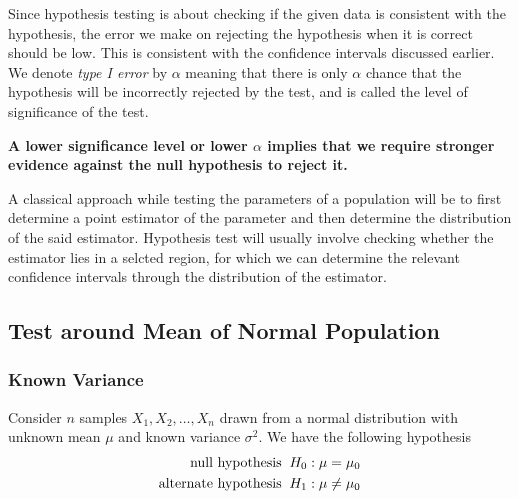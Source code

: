 \documentclass[../probability-notes.tex]{subfiles}
\begin{document}
    Since hypothesis testing is about checking if the given data is consistent with the hypothesis, the error we make on rejecting the hypothesis when it is correct should be low. This is consistent with the confidence intervals discussed earlier. We denote \emph{type I error} by $\alpha$ meaning that there is only $\alpha$ chance that the hypothesis will be incorrectly rejected by the test, and is called the level of significance of the test.\newline

    \textbf{A lower significance level or lower $\alpha$ implies that we require stronger evidence against the null hypothesis to reject it.}

    A classical approach while testing the parameters of a population will be to first determine a point estimator of the parameter and then determine the distribution of the said estimator. Hypothesis test will usually involve checking whether the estimator lies in a selcted region, for which we can determine the relevant confidence intervals through the distribution of the estimator.\newline

    
    \subsection{Test around Mean of Normal Population}
    \subsubsection{Known Variance}\label{sec:mean_normal_known_variance}
    Consider $n$ samples $X_{1}, X_{2}, \ldots, X_{n}$ drawn from a normal distribution with unknown mean $\mu$ and known variance $\sigma^{2}$. We have the following hypothesis
    \begin{align*}
        \text{null hypothesis \:} H_{0}&: \mu = \mu_{0}\\
        \text{alternate hypothesis \:} H_{1}&: \mu \neq \mu_{0}
    \end{align*}
\end{document}
